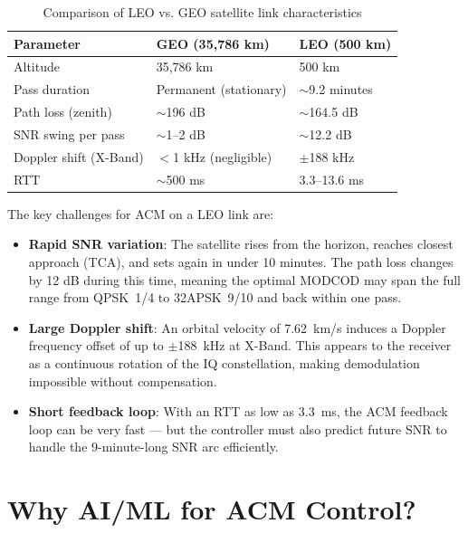 \documentclass[12pt,a4paper]{report}
\begin{document}
\begin{table}[H]
\centering
\caption{Comparison of LEO vs. GEO satellite link characteristics}
\label{tab:leo_vs_geo}
\begin{tabular}{lll}
\toprule
\textbf{Parameter}     & \textbf{GEO (35,786 km)}     & \textbf{LEO (500 km)} \\
\midrule
Altitude               & 35,786 km                     & 500 km \\
Pass duration          & Permanent (stationary)        & $\sim$9.2 minutes \\
Path loss (zenith)     & $\sim$196 dB                  & $\sim$164.5 dB \\
SNR swing per pass     & $\sim$1--2 dB                 & $\sim$12.2 dB \\
Doppler shift (X-Band) & $<$1 kHz (negligible)         & $\pm$188 kHz \\
RTT                    & $\sim$500 ms                  & 3.3--13.6 ms \\
\bottomrule
\end{tabular}
\end{table}

The key challenges for ACM on a LEO link are:
\begin{itemize}
    \item \textbf{Rapid SNR variation}: The satellite rises from the horizon,
          reaches closest approach (TCA), and sets again in under 10 minutes.
          The path loss changes by 12 dB during this time, meaning the optimal
          MODCOD may span the full range from QPSK~1/4 to 32APSK~9/10 and back
          within one pass.
    \item \textbf{Large Doppler shift}: An orbital velocity of 7.62~km/s
          induces a Doppler frequency offset of up to $\pm$188~kHz at
          X-Band. This appears to the receiver as a continuous rotation of the
          IQ constellation, making demodulation impossible without compensation.
    \item \textbf{Short feedback loop}: With an RTT as low as 3.3~ms, the ACM
          feedback loop can be very fast --- but the controller must also
          predict future SNR to handle the 9-minute-long SNR arc efficiently.
\end{itemize}

\section{Why AI/ML for ACM Control?}
\end{document}
